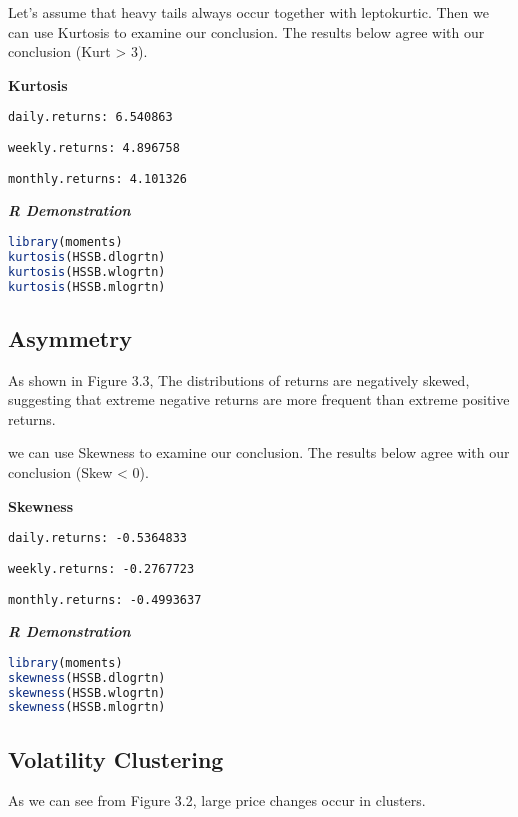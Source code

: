 \documentclass[paper=a4, fontsize=11pt]{scrartcl} %
\numberwithin{equation}{section} %
\numberwithin{figure}{section} %
\numberwithin{table}{section} %
\begin{document}
\bigskip
\bigskip
\bigskip
\bigskip
Let's assume that heavy tails always occur together with leptokurtic. Then we can use Kurtosis to examine our conclusion. The results below agree with our conclusion (Kurt > 3).

\bigskip

\textbf{Kurtosis}\par
\texttt{daily.returns: 6.540863 }\par
\texttt{weekly.returns: 4.896758}\par
\texttt{monthly.returns: 4.101326}\par

\bigskip
\textbf{\textit{R Demonstration}}
\begin{lstlisting}[language=R]
library(moments)
kurtosis(HSSB.dlogrtn)
kurtosis(HSSB.wlogrtn)
kurtosis(HSSB.mlogrtn)
\end{lstlisting}

\bigskip
\bigskip
\bigskip
\bigskip
\subsection{Asymmetry}
As shown in Figure 3.3, The distributions of returns are negatively skewed, suggesting that extreme negative returns are more frequent than extreme positive returns.\par
we can use Skewness to examine our conclusion. The results below agree with our conclusion (Skew < 0).

\bigskip

\textbf{Skewness}\par
\texttt{daily.returns: -0.5364833}\par
\texttt{weekly.returns: -0.2767723}\par
\texttt{monthly.returns: -0.4993637}\par

\bigskip
\textbf{\textit{R Demonstration}}
\begin{lstlisting}[language=R]
library(moments)
skewness(HSSB.dlogrtn)
skewness(HSSB.wlogrtn)
skewness(HSSB.mlogrtn)
\end{lstlisting}

\bigskip
\bigskip
\bigskip
\bigskip
\subsection{Volatility Clustering}

As we can see from Figure 3.2, large price changes occur in clusters.

\bigskip
\bigskip
\bigskip
\bigskip
\end{document}
